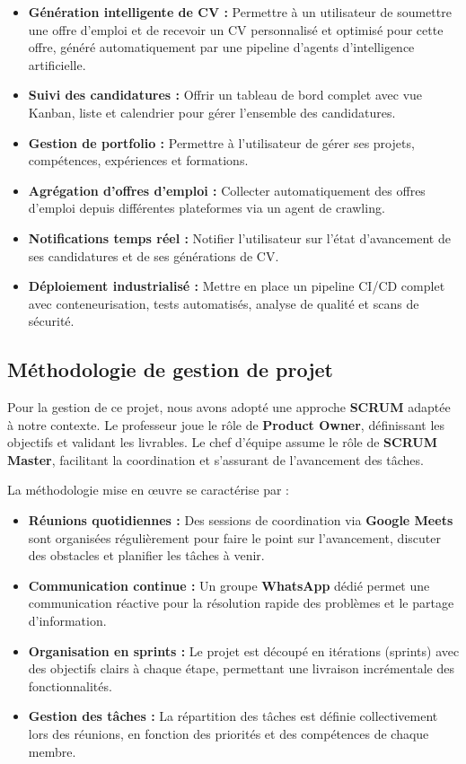 \begin{itemize}
    \item \textbf{Génération intelligente de CV :} Permettre à un utilisateur de soumettre une offre d'emploi et de recevoir un CV personnalisé et optimisé pour cette offre, généré automatiquement par une pipeline d'agents d'intelligence artificielle.
    \item \textbf{Suivi des candidatures :} Offrir un tableau de bord complet avec vue Kanban, liste et calendrier pour gérer l'ensemble des candidatures.
    \item \textbf{Gestion de portfolio :} Permettre à l'utilisateur de gérer ses projets, compétences, expériences et formations.
    \item \textbf{Agrégation d'offres d'emploi :} Collecter automatiquement des offres d'emploi depuis différentes plateformes via un agent de crawling.
    \item \textbf{Notifications temps réel :} Notifier l'utilisateur sur l'état d'avancement de ses candidatures et de ses générations de CV.
    \item \textbf{Déploiement industrialisé :} Mettre en place un pipeline CI/CD complet avec conteneurisation, tests automatisés, analyse de qualité et scans de sécurité.
\end{itemize}

\subsection{Méthodologie de gestion de projet}
\label{subsec:contexte:methodologie}

Pour la gestion de ce projet, nous avons adopté une approche \textbf{SCRUM} adaptée à notre contexte. Le professeur joue le rôle de \textbf{Product Owner}, définissant les objectifs et validant les livrables. Le chef d'équipe assume le rôle de \textbf{SCRUM Master}, facilitant la coordination et s'assurant de l'avancement des tâches.

La méthodologie mise en œuvre se caractérise par :

\begin{itemize}
    \item \textbf{Réunions quotidiennes :} Des sessions de coordination via \textbf{Google Meets} sont organisées régulièrement pour faire le point sur l'avancement, discuter des obstacles et planifier les tâches à venir.
    \item \textbf{Communication continue :} Un groupe \textbf{WhatsApp} dédié permet une communication réactive pour la résolution rapide des problèmes et le partage d'information.
    \item \textbf{Organisation en sprints :} Le projet est découpé en itérations (sprints) avec des objectifs clairs à chaque étape, permettant une livraison incrémentale des fonctionnalités.
    \item \textbf{Gestion des tâches :} La répartition des tâches est définie collectivement lors des réunions, en fonction des priorités et des compétences de chaque membre.
\end{itemize}

